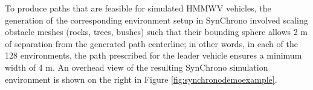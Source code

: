 \documentclass[12pt,twocolumn]{article}
\newcommand{\chrono}{Chrono}
\newcommand{\synchrono}{Syn\chrono{}}
\begin{document}
To produce paths that are feasible for simulated HMMWV vehicles, the generation of the corresponding environment setup in SynChrono involved scaling obstacle meshes (rocks, trees, bushes) such that their bounding sphere allows 2 m of separation from the generated path centerline; in other words, in each of the 128 environments, the path prescribed for the leader vehicle ensures a minimum width of 4 m. An overhead view of the resulting SynChrono simulation environment is shown on the right in Figure \ref{fig:synchronodemoexample}.


\end{document}
